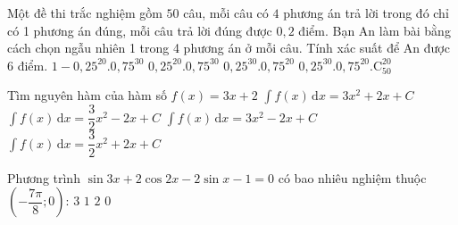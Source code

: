 \begin{ex}%
	Một đề thi trắc nghiệm gồm $50$ câu, mỗi câu có $4$ phương án trả lời trong đó chỉ có 1 phương án đúng, mỗi câu trả lời đúng được $0{,}2$ điểm. Bạn An làm bài bằng cách chọn ngẫu nhiên 1 trong 4 phương án ở mỗi câu. Tính xác suất để An được $6$ điểm.
\choice
{$1-0{,}25^{20}.0{,}75^{30}$	}
{$0{,}25^{20}.0{,}75^{30}$	}
{\True $0{,}25^{30}.0{,}75^{20}$	}
{$0{,}25^{30}.0{,}75^{20}.\mathrm{C}_{50}^{20}$ }
\end{ex}
\begin{ex}%
	Tìm nguyên hàm của hàm số $f(x)=3x+2$ 
	\choice
	{$\displaystyle\int\limits f(x)\mathrm{\,d}x=3x^2+2x+C$	}
	{$\displaystyle\int\limits f(x)\mathrm{\,d}x=\dfrac{3}{2}x^2-2x+C$ 
	}
	{$\displaystyle\int\limits f(x)\mathrm{\,d}x=3x^2-2x+C$	}
	{\True $\displaystyle\int\limits f(x)\mathrm{\,d}x=\dfrac{3}{2}x^2+2x+C$}
\end{ex}
\begin{ex}%
	Phương trình $\sin 3x+2\cos 2x-2\sin x-1=0$ có bao nhiêu nghiệm thuộc $\left(-\dfrac{7\pi}{8};0\right)$: 
	\choice
	{\True $3$	}
	{$1$	}
	{$2$	}
	{$0$ }
\end{ex}
